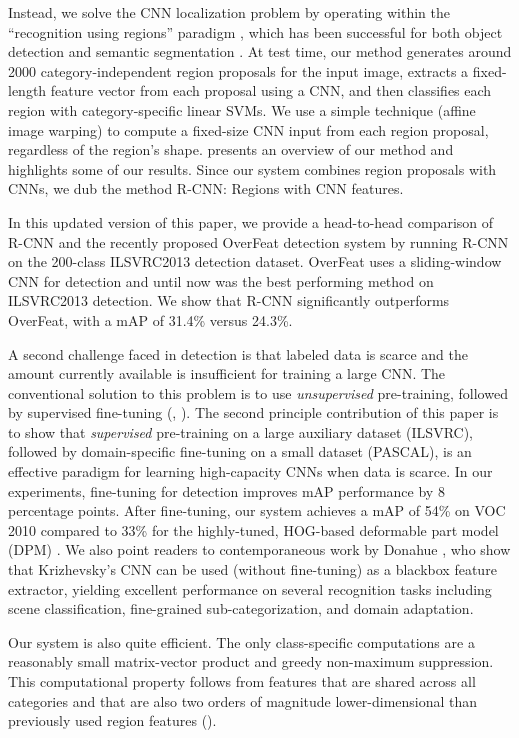 Instead, we solve the CNN localization problem by operating within the ``recognition using regions'' paradigm \cite{gu2009recognition}, which has been successful for both object detection \cite{UijlingsIJCV2013} and semantic segmentation \cite{carreira2012cpmc}.
At test time, our method generates around 2000 category-independent region proposals for the input image, extracts a fixed-length feature vector from each proposal using a CNN, and then classifies each region with category-specific linear SVMs.
We use a simple technique (affine image warping) to compute a fixed-size CNN input from each region proposal, regardless of the region's shape.
 presents an overview of our method and highlights some of our results.
Since our system combines region proposals with CNNs, we dub the method R-CNN: Regions with CNN features.

In this updated version of this paper, we provide a head-to-head comparison of R-CNN and the recently proposed OverFeat \cite{overfeat} detection system by running R-CNN on the 200-class ILSVRC2013 detection dataset.
OverFeat uses a sliding-window CNN for detection and until now was the best performing method on ILSVRC2013 detection.
We show that R-CNN significantly outperforms OverFeat, with a mAP of 31.4\% versus 24.3\%.

A second challenge faced in detection is that labeled data is scarce and the amount currently available is insufficient for training a large CNN.
The conventional solution to this problem is to use \emph{unsupervised} pre-training, followed by supervised fine-tuning (\eg, \cite{sermanetCVPR13}).
The second principle contribution of this paper is to show that \emph{supervised} pre-training on a large auxiliary dataset (ILSVRC), followed by domain-specific fine-tuning on a small dataset (PASCAL), is an effective paradigm for learning high-capacity CNNs when data is scarce.
In our experiments, fine-tuning for detection improves mAP performance by 8 percentage points.
After fine-tuning, our system achieves a mAP of 54\% on VOC 2010 compared to 33\% for the highly-tuned, HOG-based deformable part model (DPM) \cite{lsvm-pami,release5}.
We also point readers to contemporaneous work by Donahue \etal \cite{decafICML}, who show that Krizhevsky's CNN can be used (without fine-tuning) as a blackbox feature extractor, yielding excellent performance on several recognition tasks including scene classification, fine-grained sub-categorization, and domain adaptation.

Our system is also quite efficient.
The only class-specific computations are a reasonably small matrix-vector product and greedy non-maximum suppression.
This computational property follows from features that are shared across all categories and that are also two orders of magnitude lower-dimensional than previously used region features (\cf \cite{UijlingsIJCV2013}).


